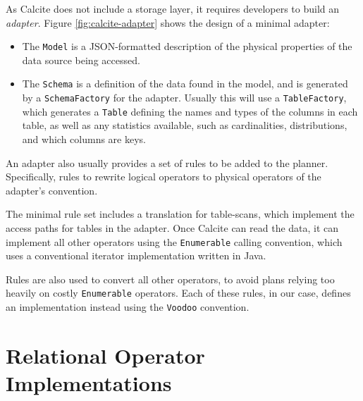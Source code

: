 As Calcite does not include a storage layer, it requires developers to build an \emph{adapter}. Figure \ref{fig:calcite-adapter} shows the design of a minimal adapter:
\begin{itemize}
    \item The \texttt{Model} is a JSON-formatted description of the physical properties of the data source being accessed.
    \item The \texttt{Schema} is a definition of the data found in the model, and is generated by a \texttt{SchemaFactory} for the adapter. Usually this will use a \texttt{TableFactory}, which generates a \texttt{Table} defining the names and types of the columns in each table, as well as any statistics available, such as cardinalities, distributions, and which columns are keys.
\end{itemize}

An adapter also usually provides a set of rules to be added to the planner. Specifically, rules to rewrite logical operators to physical operators of the adapter's convention.

The minimal rule set includes a translation for table-scans, which implement the access paths for tables in the adapter. Once Calcite can read the data, it can implement all other operators using the \texttt{Enumerable} calling convention, which uses a conventional iterator implementation written in Java.

Rules are also used to convert all other operators, to avoid plans relying too heavily on costly \texttt{Enumerable} operators. Each of these rules, in our case, defines an implementation instead using the \texttt{Voodoo} convention.

\chapter{Relational Operator Implementations}
\label{appendix:rel}

